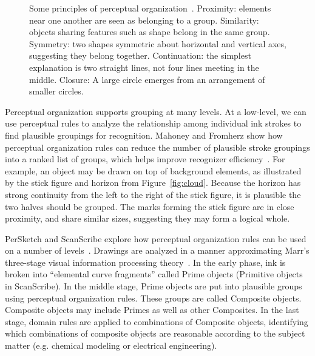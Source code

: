 \begin{figure}
\caption{Some principles of perceptual organization~\cite{kanizsa-gestalt}. 
          Proximity: elements near one
         another are seen as belonging to a
         group.  Similarity: objects
         sharing features such as shape belong in the same
         group.  Symmetry: two shapes
         symmetric about horizontal and vertical axes, suggesting they
         belong together. 
         Continuation: the simplest explanation is two straight lines,
         not four lines meeting in the
         middle.  Closure: A large circle
         emerges from an arrangement of smaller circles.}
\label{fig:gestalt}
\end{figure}

Perceptual organization supports grouping at many levels. At a
low-level, we can use perceptual rules to analyze the relationship
among individual ink strokes to find plausible groupings for
recognition. Mahoney and Fromherz show how perceptual organization
rules can reduce the number of plausible stroke groupings into a
ranked list of groups, which helps improve recognizer
efficiency~\cite{mahoney-sketching-issues}. For example, an object may
be drawn on top of background elements, as illustrated by the stick
figure and horizon from Figure~\ref{fig:cloud}. Because the horizon
has strong continuity from the left to the right of the stick figure,
it is plausible the two halves should be grouped. The marks forming
the stick figure are in close proximity, and share similar sizes,
suggesting they may form a logical whole.

PerSketch and ScanScribe explore how perceptual organization rules can
be used on a number of
levels~\cite{saund-persketch,saund-perceptual}. Drawings are analyzed
in a manner approximating Marr's three-stage visual information
processing theory~\cite{marr-visual-infoprocessing}. In the early
phase, ink is broken into ``elemental curve fragments'' called Prime
objects (Primitive objects in ScanScribe). In the middle stage, Prime
objects are put into plausible groups using perceptual organization
rules. These groups are called Composite objects. Composite objects
may include Primes as well as other Composites. In the last stage,
domain rules are applied to combinations of Composite objects,
identifying which combinations of composite objects are reasonable
according to the subject matter (e.g. chemical modeling or electrical
engineering).

